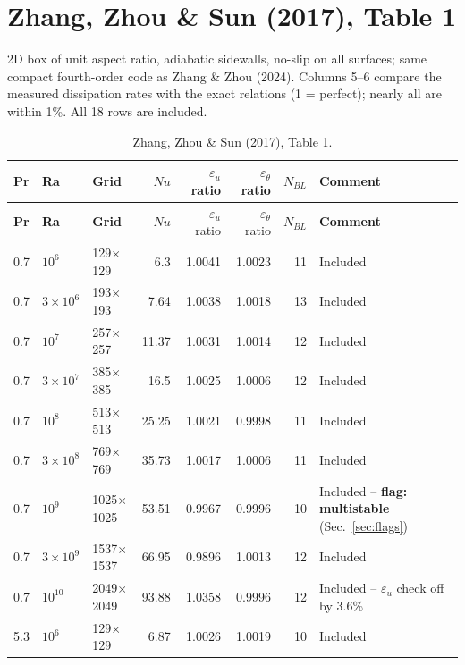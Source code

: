 \documentclass[11pt]{article}
\begin{document}
\section{Zhang, Zhou \& Sun (2017), Table 1}\label{sec:zzs2017}
2D box of unit aspect ratio, adiabatic sidewalls, no-slip on all surfaces;
same compact fourth-order code as Zhang \& Zhou (2024). Columns 5--6 compare
the measured dissipation rates with the exact relations (1 = perfect);
nearly all are within 1\%. All 18 rows are included.

\begin{longtable}{l l l r r r r p{5.2cm}}
\caption{Zhang, Zhou \& Sun (2017), Table 1.}\label{tab:zzs2017}\\
\toprule
\textbf{Pr} & \textbf{Ra} & \textbf{Grid} & $Nu$ & $\varepsilon_u$ ratio & $\varepsilon_\theta$ ratio & $N_{BL}$ & \textbf{Comment} \\
\midrule
\endfirsthead
\toprule
\textbf{Pr} & \textbf{Ra} & \textbf{Grid} & $Nu$ & $\varepsilon_u$ ratio & $\varepsilon_\theta$ ratio & $N_{BL}$ & \textbf{Comment} \\
\midrule
\endhead
\bottomrule
\endfoot
\rowcolor{included} 0.7 & $10^{6}$ & 129$\times$129 & 6.3 & 1.0041 & 1.0023 & 11 & Included \\
\rowcolor{included} 0.7 & $3\times10^{6}$ & 193$\times$193 & 7.64 & 1.0038 & 1.0018 & 13 & Included \\
\rowcolor{included} 0.7 & $10^{7}$ & 257$\times$257 & 11.37 & 1.0031 & 1.0014 & 12 & Included \\
\rowcolor{included} 0.7 & $3\times10^{7}$ & 385$\times$385 & 16.5 & 1.0025 & 1.0006 & 12 & Included \\
\rowcolor{included} 0.7 & $10^{8}$ & 513$\times$513 & 25.25 & 1.0021 & 0.9998 & 11 & Included \\
\rowcolor{included} 0.7 & $3\times10^{8}$ & 769$\times$769 & 35.73 & 1.0017 & 1.0006 & 11 & Included \\
\rowcolor{included} 0.7 & $10^{9}$ & 1025$\times$1025 & 53.51 & 0.9967 & 0.9996 & 10 & Included -- \textbf{flag: multistable} (Sec.~\ref{sec:flags}) \\
\rowcolor{included} 0.7 & $3\times10^{9}$ & 1537$\times$1537 & 66.95 & 0.9896 & 1.0013 & 12 & Included \\
\rowcolor{included} 0.7 & $10^{10}$ & 2049$\times$2049 & 93.88 & 1.0358 & 0.9996 & 12 & Included -- $\varepsilon_u$ check off by 3.6\% \\
\rowcolor{included} 5.3 & $10^{6}$ & 129$\times$129 & 6.87 & 1.0026 & 1.0019 & 10 & Included \\

\end{longtable}
\end{document}
